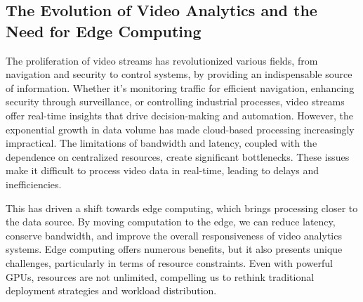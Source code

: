 

\subsection{The Evolution of Video Analytics and the Need for Edge Computing}

The proliferation of video streams has revolutionized various fields, from navigation and security to control systems, by providing an indispensable source of information. Whether it's monitoring traffic for efficient navigation, enhancing security through surveillance, or controlling industrial processes, video streams offer real-time insights that drive decision-making and automation. However, the exponential growth in data volume has made cloud-based processing increasingly impractical. The limitations of bandwidth and latency, coupled with the dependence on centralized resources, create significant bottlenecks. These issues make it difficult to process video data in real-time, leading to delays and inefficiencies.

This has driven a shift towards edge computing, which brings processing closer to the data source. By moving computation to the edge, we can reduce latency, conserve bandwidth, and improve the overall responsiveness of video analytics systems. Edge computing offers numerous benefits, but it also presents unique challenges, particularly in terms of resource constraints. Even with powerful GPUs, resources are not unlimited, compelling us to rethink traditional deployment strategies and workload distribution.

